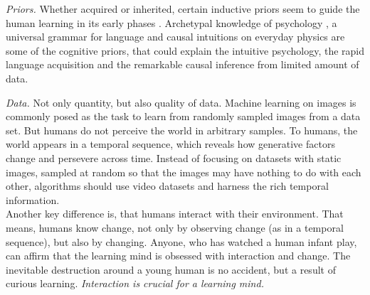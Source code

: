 	\emph{Priors.}
		Whether acquired or inherited, certain inductive priors seem to guide the human learning in its early phases \cite{tenenbaum18think}.
		Archetypal knowledge of psychology \cite{jung68archetype}, a universal grammar for language \cite{chomsky00horizons} and causal intuitions on everyday physics \cite{teglas11intuitive} are some of the cognitive priors, that could explain the intuitive psychology, the rapid language acquisition and the remarkable causal inference from limited amount of data.

	\emph{Data.}
		Not only quantity, but also quality of data. Machine learning on images is commonly posed as the task to learn from randomly sampled images from a data set. But humans do not perceive the world in arbitrary samples.
		To humans, the world appears in a temporal sequence, which reveals how generative factors change and persevere across time. Instead of focusing on datasets with static images, sampled at random so that the images may have nothing to do with each other, algorithms should use video datasets and harness the rich temporal information.\\
		Another key difference is, that humans interact with their environment.
		That means, humans know change, not only by observing change (as in a temporal sequence), but also by changing.
		Anyone, who has watched a human infant play, can affirm that the learning mind is obsessed with interaction and change. The inevitable destruction around a young human is no accident, but a result of curious learning.
		\textit{Interaction is crucial for a learning mind.}



